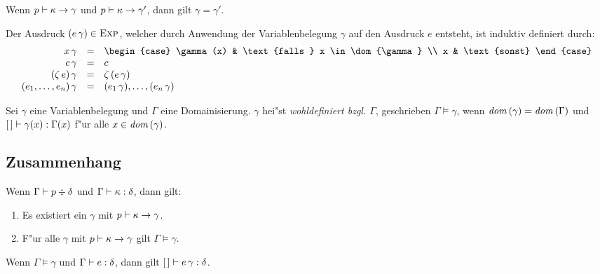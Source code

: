 \documentclass[12pt,a4paper]{article}
\begin{document}
\begin{lemma}
  Wenn ${p}\vdash{\kappa}\to{\gamma}$ und ${p}\vdash{\kappa}\to{\gamma'}$, dann gilt $\gamma = \gamma'$.
\end{lemma}

Der Ausdruck $(e\,\gamma) \in \textsc{Exp}$, welcher durch Anwendung der Variablenbelegung $\gamma$ auf den Ausdruck
$e$ entsteht, ist induktiv definiert durch:
\[\begin{array}{rcl}
  x\,\gamma &=& \begin{case} \gamma(x) & \text{falls } x \in \dom{\gamma} \\ x & \text{sonst} \end{case} \\
  c\,\gamma &=& c \\
  (\zeta\,e)\,\gamma &=& \zeta\,(e\,\gamma) \\
  (e_1,\ldots,e_n)\,\gamma &=& (e_1\,\gamma),\ldots,(e_n\,\gamma) \\
\end{array}\]

Sei $\gamma$ eine Variablenbelegung und $\Gamma$ eine Domainisierung. $\gamma$ hei"st \emph{wohldefiniert bzgl.
$\Gamma$}, geschrieben $\Gamma \models \gamma$, wenn $\mathit{dom}\,(\gamma) = \mathit{dom}\,(\Gamma)$ und
${[\,]}\vdash{\gamma(x)}:{\Gamma(x)}$ f"ur alle $x \in \mathit{dom}\,(\gamma)$.


\subsection{Zusammenhang}

\begin{proposition}
  Wenn ${\Gamma}\vdash{p}\div{\delta}$ und ${\Gamma}\vdash{\kappa}:{\delta}$, dann gilt:
  \begin{enumerate}
  \item Es existiert ein $\gamma$ mit ${p}\vdash{\kappa}\to{\gamma}$.
  \item F"ur alle $\gamma$ mit ${p}\vdash{\kappa}\to{\gamma}$ gilt $\Gamma \models \gamma$.
  \end{enumerate}
\end{proposition}

\begin{proposition}
  Wenn $\Gamma \models \gamma$ und ${\Gamma}\vdash{e}:{\delta}$, dann gilt
  ${[\,]}\vdash{e\,\gamma}:{\delta}$.
\end{proposition}
\end{document}

